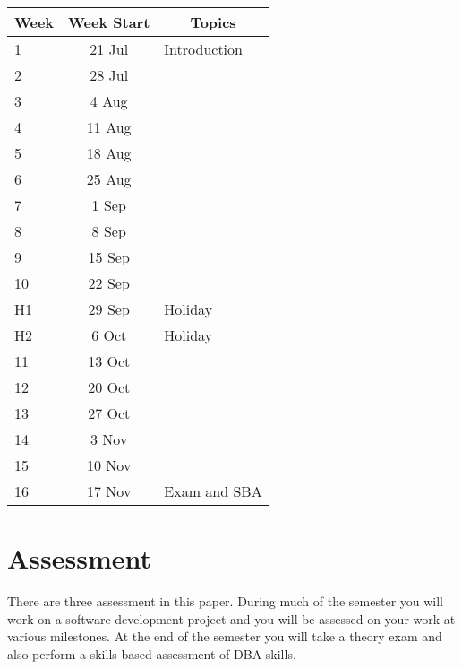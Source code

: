 \documentclass{article}
\begin{document}
\renewcommand{\arraystretch}{1.5}
\begin{tabular}{|l|c|l|}
\hline
 Week & Week Start & \multicolumn{1}{c|}{Topics}                   \\ \hline
 1    & 21 Jul     & Introduction                                  \\ \hline
 2    & 28 Jul     &                                               \\ \hline
 3    &  4 Aug     &                                               \\ \hline
 4    & 11 Aug     &                                               \\ \hline
 5    & 18 Aug     &                                               \\ \hline
 6    & 25 Aug     &                                               \\ \hline
 7    &  1 Sep     &                                               \\ \hline
 8    &  8 Sep     &                                               \\ \hline
 9    & 15 Sep     &                                               \\ \hline
 10   & 22 Sep     &                                               \\ \hline
 H1   & 29 Sep     & Holiday                                       \\ \hline
 H2   &  6 Oct     & Holiday                                       \\ \hline
 11   & 13 Oct     &                                               \\ \hline
 12   & 20 Oct     &                                               \\ \hline
 13   & 27 Oct     &                                               \\ \hline
 14   &  3 Nov     &                                               \\ \hline
 15   & 10 Nov     &                                               \\ \hline
 16   & 17 Nov     & Exam and SBA                                  \\ \hline
\end{tabular}

\section*{Assessment}
There are three assessment in this paper.  During much of the semester you will work on a software development project and you will be assessed on your work at various milestones.
At the end of the semester you will take a theory exam and also perform a skills based assessment of DBA skills.
\vspace{1\baselineskip}
\end{document}
